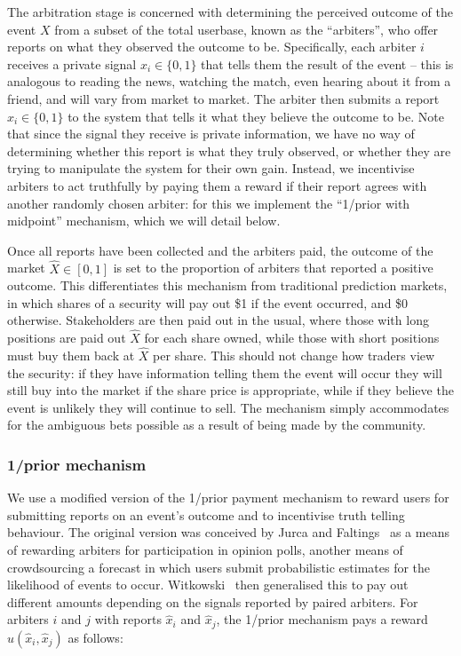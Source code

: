 The arbitration stage is concerned with determining the perceived outcome
of the event $X$ from a subset of the total userbase, known as the
``arbiters'', who offer reports on what they observed the outcome to be.
Specifically, each arbiter $i$ receives a private signal $x_i \in \{0,1\}$ that
tells them the result of the event -- this is analogous to reading the news,
watching the match, even hearing about it from a friend, and will vary from
market to market. The arbiter then submits a report $\hat{x}_i \in \{0,1\}$ to
the system that tells it what they believe the outcome to be. Note that since
the signal they receive is private information, we have no way of determining
whether this report is what they truly observed, or whether they are trying to
manipulate the system for their own gain. Instead, we incentivise arbiters to
act truthfully by paying them a reward if their report agrees with another
randomly chosen arbiter: for this we implement the ``1/prior with midpoint''
mechanism, which we will detail below.

Once all reports have been collected and the arbiters paid, the outcome of the
market $\hat{X} \in [0,1]$ is set to the proportion of arbiters that reported a
positive outcome. This differentiates this mechanism from traditional
prediction markets, in which shares of a security will pay out \$1 if the event
occurred, and \$0 otherwise. Stakeholders are then paid out in the usual, where
those with long positions are paid out $\hat{X}$ for each share owned, while
those with short positions must buy them back at $\hat{X}$ per share. This
should not change how traders view the security: if they have information
telling them the event will occur they will still buy into the market if the
share price is appropriate, while if they believe the event is unlikely they
will continue to sell. The mechanism simply accommodates for the ambiguous bets
possible as a result of being made by the community.

\subsubsection{1/prior mechanism}

We use a modified version of the 1/prior payment mechanism to reward users for
submitting reports on an event's outcome and to incentivise truth telling
behaviour. The original version was conceived by Jurca and
Faltings~\cite{JurcaFaltings2008, JurcaFaltings2011} as a means of rewarding
arbiters for participation in opinion polls, another means of crowdsourcing a
forecast in which users submit probabilistic estimates for the likelihood of
events to occur. Witkowski~\cite{Witkowski2014} then generalised this to pay
out different amounts depending on the signals reported by paired arbiters. For
arbiters $i$ and $j$ with reports $\hat{x}_i$ and $\hat{x}_j$, the 1/prior
mechanism pays a reward $u(\hat{x}_i, \hat{x}_j)$ as follows:


